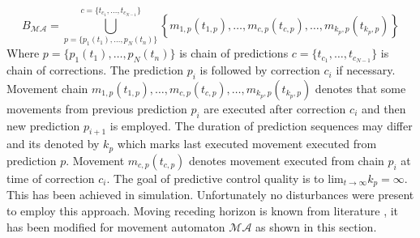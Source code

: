 \begin{equation}
    B_{\mathscr{MA}} = \bigcup_{p=\{p_1(t_1),\dots,p_N(t_n)\}}^{c=\{t_{c_1},\dots,t_{c_{N-1}}\}} \left\{m_{1,p}(t_{1,p}),\dots,m_{c,p}(t_{c,p}),\dots,m_{k_p,p}(t_{k_p,p})\right\}
\end{equation}
\noindent Where $p=\{p_1(t_1),\dots,p_N(t_n)\}$ is chain of predictions $c=\{t_{c_1},\dots,t_{c_{N-1}}\}$ is chain of corrections. The prediction $p_i$ is followed by correction $c_i$ if necessary. Movement chain $m_{1,p}(t_{1,p}),\dots,m_{c,p}(t_{c,p}),\dots,m_{k_p,p}(t_{k_p,p})$ denotes that some movements from previous prediction $p_i$ are executed after correction $c_i$ and then new prediction $p_{i+1}$ is employed. The duration of prediction sequences may differ and its denoted by $k_p$ which marks last executed movement executed from prediction $p$. Movement $m_{c,p}(t_{c,p})$ denotes movement executed from chain $p_i$ at time of correction $c_i$. The goal of predictive control quality is to $\text{lim}_{t\to\infty} k_p = \infty$. This has been achieved in simulation. Unfortunately no disturbances were present to employ this approach. Moving receding horizon is known from literature \cite{rawlings1993stability}, it has been modified for movement automaton $\mathscr{MA}$ as shown in this section.

